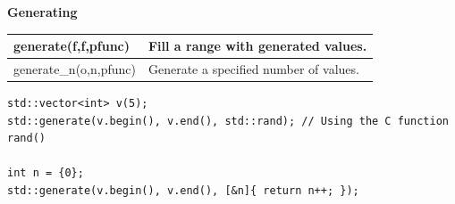 \documentclass[a4paper,11pt,twoside]{book}
\newcommand{\tophline}{\hline }
\newcommand{\bottomhline}{\\ \hline }
\newcommand{\tophline}{ }
\newcommand{\bottomhline}{ }
\begin{document}
\textbf{Generating} \\

\begin{tabular}{| p{} |p{}|}
\tophline generate(f,f,pfunc)  & Fill a range with generated values.   \\
\tophline generate\_n(o,n,pfunc)  & Generate a specified number of values.   \bottomhline
\end{tabular}

\begin{lstlisting}[numbers=none]
std::vector<int> v(5);
std::generate(v.begin(), v.end(), std::rand); // Using the C function rand()

int n = {0};
std::generate(v.begin(), v.end(), [&n]{ return n++; });
\end{lstlisting}
\end{document}

